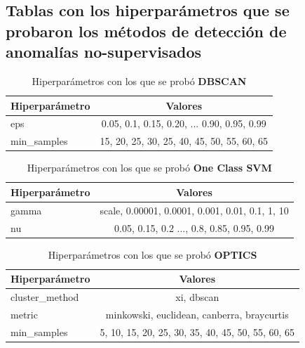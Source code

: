 \begin{appendices}
	\section*{Tablas con los hiperparámetros que se probaron los métodos de detección de anomalías no-supervisados}

		\begin{table}[htb]
			\centering
			\caption{Hiperparámetros con los que se probó \textbf{DBSCAN}}
			\label{table:4}
			\begin{tabular}{lc}
			\toprule
			Hiperparámetro &                                     Valores \\
			\midrule
					   eps & 0.05, 0.1, 0.15, 0.20, ... 0.90, 0.95, 0.99 \\
			   min\_samples & 15, 20, 25, 30, 25, 40,  45, 50, 55, 60, 65 \\
			\bottomrule
			\end{tabular}
		\end{table}

		\begin{table}[htb]
			\centering
			\caption{Hiperparámetros con los que se probó \textbf{One Class SVM}}
			\label{table:5}
			\begin{tabular}{lc}
			\toprule
			Hiperparámetro &                                            Valores \\
			\midrule
					 gamma &    scale, 0.00001, 0.0001, 0.001, 0.01, 0.1, 1, 10 \\
						nu & 0.05, 0.15, 0.2 ..., 0.8, 0.85, 0.95, 0.99 \\
			\bottomrule
			\end{tabular}
		\end{table}
		
		\begin{table}[htb]
			\centering
			\caption{Hiperparámetros con los que se probó \textbf{OPTICS}}
			\label{table:6}
			\begin{tabular}{lc}
			\toprule
			Hiperparámetro &                                           Valores \\
			\midrule
			cluster\_method &                                        xi, dbscan \\
					metric &        minkowski, euclidean, canberra, braycurtis \\
			   min\_samples & 5, 10, 15, 20, 25, 30, 35, 40, 45, 50, 55, 60, 65 \\
			\bottomrule
			\end{tabular}
		\end{table}
		

\end{appendices}
